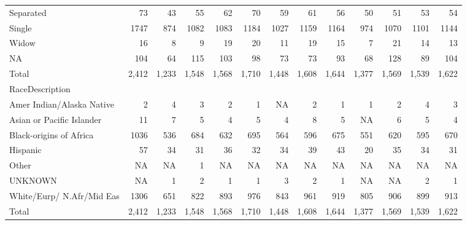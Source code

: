 \documentclass[]{article}
\begin{document}
\begin{longtable}{lrrrrrrrrrrrr}
Separated & 73 & 43 & 55 & 62 & 70 & 59 & 61 & 56 & 50 & 51 & 53 & 54 \\ 
Single & 1747 & 874 & 1082 & 1083 & 1184 & 1027 & 1159 & 1164 & 974 & 1070 & 1101 & 1144 \\ 
Widow & 16 & 8 & 9 & 19 & 20 & 11 & 19 & 15 & 7 & 21 & 14 & 13 \\ 
NA & 104 & 64 & 115 & 103 & 98 & 73 & 73 & 93 & 68 & 128 & 89 & 104 \\ 
\midrule 
Total & 2,412 & 1,233 & 1,548 & 1,568 & 1,710 & 1,448 & 1,608 & 1,644 & 1,377 & 1,569 & 1,539 & 1,622 \\ 
\midrule
\multicolumn{1}{l}{RaceDescription} \\ 
\midrule
Amer Indian/Alaska Native & 2 & 4 & 3 & 2 & 1 & NA & 2 & 1 & 1 & 2 & 4 & 3 \\ 
Asian or Pacific Islander & 11 & 7 & 5 & 4 & 5 & 4 & 8 & 5 & NA & 6 & 5 & 4 \\ 
Black-origins of Africa & 1036 & 536 & 684 & 632 & 695 & 564 & 596 & 675 & 551 & 620 & 595 & 670 \\ 
Hispanic & 57 & 34 & 31 & 36 & 32 & 34 & 39 & 43 & 20 & 35 & 34 & 31 \\ 
Other & NA & NA & 1 & NA & NA & NA & NA & NA & NA & NA & NA & NA \\ 
UNKNOWN & NA & 1 & 2 & 1 & 1 & 3 & 2 & 1 & NA & NA & 2 & 1 \\ 
White/Eurp/ N.Afr/Mid Eas & 1306 & 651 & 822 & 893 & 976 & 843 & 961 & 919 & 805 & 906 & 899 & 913 \\ 
\midrule 
Total & 2,412 & 1,233 & 1,548 & 1,568 & 1,710 & 1,448 & 1,608 & 1,644 & 1,377 & 1,569 & 1,539 & 1,622 \\ 
\bottomrule
\end{longtable}
\end{document}
